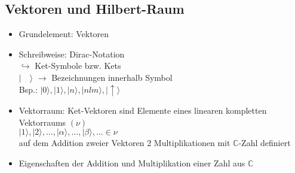 \documentclass[10pt,article,colorback,accentcolor=tud9d]{scrartcl}
\begin{document}
\subsection{Vektoren und Hilbert-Raum}
\begin{itemize}
\item Grundelement: Vektoren
\item Schreibweise: Dirac-Notation\\
$\hookrightarrow$ Ket-Symbole bzw. Kets\\
$\left| \quad \rangle  \right.$ $\rightarrow$ Bezeichnungen innerhalb Symbol\\
Bsp.: $\left| 0\rangle \right.,\left|1\rangle \right.,\left|n\rangle \right.,\left|nlm\rangle \right.,
\left| \uparrow\rangle \right.$
\item Vektorraum: Ket-Vektoren sind Elemente eines linearen kompletten 
Vektorraums $(\nu)$\\
$\left|1\rangle \right.,\left|2\rangle \right.,...,\left|\alpha\rangle \right.,...,\left|\beta\rangle 
\right.,... \in \nu$\\
auf dem Addition zweier Vektoren 2 Multiplikationen mit $\mathbb{C}$-Zahl 
definiert
\item Eigenschaften der Addition und Multiplikation einer Zahl aus $\mathbb{C}$
 

\end{itemize}
\end{document}
